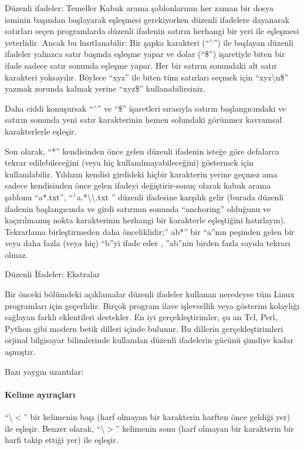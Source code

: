 \begin{section}{Düzenli ifadeler: Temeller}
Kabuk arama şablonlarının her zaman bir dosya isminin başından başlayarak eşleşmesi gerekiyorken düzenli ifadelere dayanarak satırları seçen programlarda düzenli ifadenin satırın herhangi bir yeri ile eşleşmesi yeterlidir. Ancak bu kısıtlanabilir: Bir şapka karakteri (“$ ^\wedge $”) ile başlayan düzenli ifadeler yalnızca satır başında eşleşme yapar ve dolar (“\$”) işaretiyle biten bir ifade sadece satır sonunda eşleşme yapar. Her bir satırın sonundaki alt satır karakteri yoksayılır. Böylece “xyz” ile biten tüm satırları seçmek için “xyz\textbackslash n\$” yazmak zorunda kalmak yerine “xyz\$” kullanabilirsiniz.

Daha ciddi konuşursak “$ ^\wedge $” ve “\$” işaretleri sırasıyla satırın başlangıcındaki ve satırın sonunda yeni satır karakterinin hemen solundaki görünmez kavramsal karakterlerle eşleşir.

Son olarak, “*” kendisinden önce gelen düzenli ifadenin isteğe göre defalarca tekrar edilebileceğini (veya hiç kullanılmayabileceğini) göstermek için kullanılabilir. Yıldızın kendisi girdideki hiçbir karakterin yerine geçmez ama sadece kendisinden önce gelen ifadeyi değiştirir-sonuç olarak kabuk arama şablonu “a*.txt”, “$ ^\wedge $a.*\textbackslash \textbackslash.txt ” düzenli ifadesine karşılık gelir (burada düzenli ifadenin başlangıcında ve girdi satırının sonunda “anchoring” olduğunu ve kaçırılmamış nokta karakterinin herhangi bir karakterle eşleştiğini hatırlayın). Tekrarlama birleştirmeden daha önceliklidir;” ab*” bir “a”nın peşinden gelen bir veya daha fazla (veya hiç) “b”yi ifade eder , ”ab”nin birden fazla sayıda tekrarı olmaz.

\begin{subsection}{Düzenli İfadeler: Ekstralar}

Bir önceki bölümdeki açıklamalar düzenli ifadeler kullanan neredeyse tüm Linux programları için geçerlidir. Birçok program ilave işlevsellik veya gösterim kolaylığı sağlayan farklı eklentileri destekler. En iyi gerçekleştirimler, şu an Tcl, Perl, Python gibi modern betik dilleri içinde bulunur. Bu dillerin gerçekleştirimleri orjinal bilgisayar bilimlerinde kullanılan düzenli ifadelerin gücünü şimdiye kadar aşmıştır.

Bazı yaygın uzantılar:

\paragraph{Kelime ayıraçları}{ “\textbackslash $<$” bir kelimenin başı (harf olmayan bir karakterin harften önce geldiği yer) ile eşleşir. Benzer olarak, “\textbackslash$>$” kelimenin sonu (harf olmayan bir karakterin bir harfi takip ettiği yer) ile eşleşir.}

\end{subsection}
\end{section}
